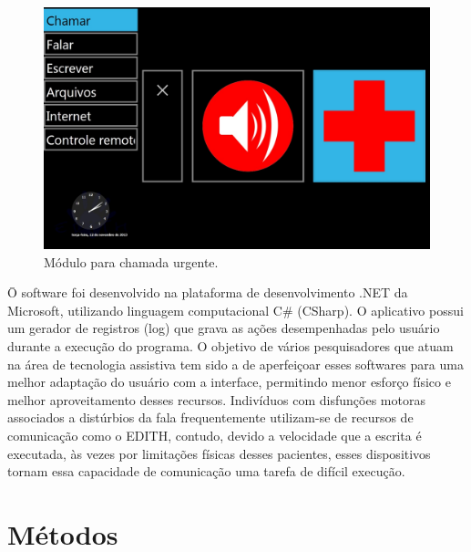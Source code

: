 \documentclass[twoside]{article}
\begin{document}
\begin{multicols}{2}
\begin{figure}[H]
\label{fig:edith_chamar}
  \caption{Módulo para chamada urgente.}
  \centering
    \includegraphics[scale = 0.18]{edith_chamar.png}
\end{figure}

\=O software foi desenvolvido na plataforma de desenvolvimento .NET da Microsoft, utilizando linguagem computacional C\# (CSharp). O aplicativo possui um gerador de registros (log) que grava as ações desempenhadas pelo usuário durante a execução do programa. O objetivo de vários pesquisadores que atuam na área de tecnologia assistiva tem sido a de aperfeiçoar esses softwares para uma melhor adaptação do usuário com a interface, permitindo menor esforço físico e melhor aproveitamento desses recursos. Indivíduos com disfunções motoras associados a distúrbios da fala frequentemente utilizam-se de recursos de comunicação como o EDITH, contudo, devido a velocidade que a escrita é executada, às vezes por limitações físicas desses pacientes, esses dispositivos tornam essa capacidade de comunicação uma tarefa de difícil execução. 

\section{Métodos}


\end{multicols}
\end{document}
